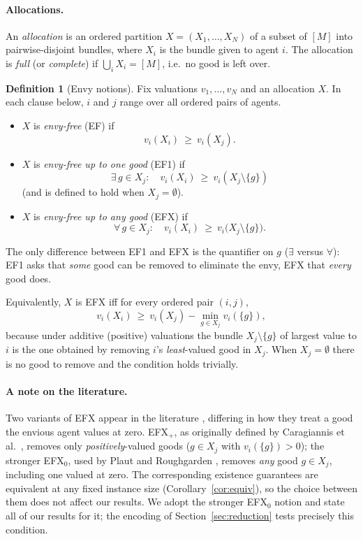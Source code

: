 \documentclass[11pt,a4paper]{article}
\theoremstyle{definition}
\newtheorem{definition}{Definition}
\theoremstyle{plain}
\newcommand{\EFX}{\textsf{EFX}}
\newcommand{\EFone}{\textsf{EF1}}
\newcommand{\agents}{N}
\newcommand{\goods}{M}
\newcommand{\val}[1]{v_{#1}}
\begin{document}
\paragraph{Allocations.}
An \emph{allocation} is an ordered partition $X=(X_1,\dots,X_\agents)$ of a
subset of $[\goods]$ into pairwise-disjoint bundles, where $X_i$ is the bundle
given to agent $i$. The allocation is \emph{full} (or \emph{complete}) if
$\bigcup_i X_i = [\goods]$, i.e.\ no good is left over.

\begin{definition}[Envy notions]
\label{def:efx}
Fix valuations $\val{1},\dots,\val{\agents}$ and an allocation $X$. In each clause
below, $i$ and $j$ range over all ordered pairs of agents.
\begin{itemize}
  \item $X$ is \emph{envy-free} (\textsf{EF}) if
        \[
          \val{i}(X_i)\ \geq\ \val{i}(X_j).
        \]
  \item $X$ is \emph{envy-free up to one good} (\EFone) if
        \[
          \exists\, g\in X_j:\quad
          \val{i}(X_i)\ \geq\ \val{i}(X_j\setminus\{g\})
        \]
        (and is defined to hold when $X_j=\emptyset$).
  \item $X$ is \emph{envy-free up to any good} (\EFX) if
        \[
          \forall\, g\in X_j:\quad
          \val{i}(X_i)\ \geq\ \val{i}\bigl(X_j\setminus\{g\}\bigr).
        \]
\end{itemize}
The only difference between \EFone{} and \EFX{} is the quantifier on $g$ ($\exists$
versus $\forall$): \EFone{} asks that \emph{some} good can be removed to eliminate
the envy, \EFX{} that \emph{every} good does.
\end{definition}

Equivalently, $X$ is \EFX{} iff for every ordered pair $(i,j)$,
\[
  \val{i}(X_i)\ \geq\ \val{i}(X_j) - \min_{g\in X_j}\val{i}(\{g\}),
\]
because under additive (positive) valuations the bundle $X_j\setminus\{g\}$ of
largest value to $i$ is the one obtained by removing $i$'s \emph{least}-valued
good in $X_j$. When $X_j=\emptyset$ there is no good to remove and the condition
holds trivially.

\paragraph{A note on the literature.}
Two variants of \EFX{} appear in the literature \cite{AmanatidisSurvey2023},
differing in how they treat a good the envious agent values at zero. \EFX$_+$, as
originally defined by Caragiannis et al.\ \cite{Caragiannis2019}, removes only
\emph{positively}-valued goods ($g\in X_j$ with $\val{i}(\{g\})>0$); the stronger
\EFX$_0$, used by Plaut and Roughgarden \cite{PlautRoughgarden2020}, removes
\emph{any} good $g\in X_j$, including one valued at zero. The corresponding
existence guarantees are equivalent at any fixed instance size
(Corollary~\ref{cor:equiv}), so the choice between them does not affect our
results. We adopt the stronger \EFX$_0$ notion and state all of our results for
it; the encoding of Section~\ref{sec:reduction} tests precisely this condition.
\end{document}
